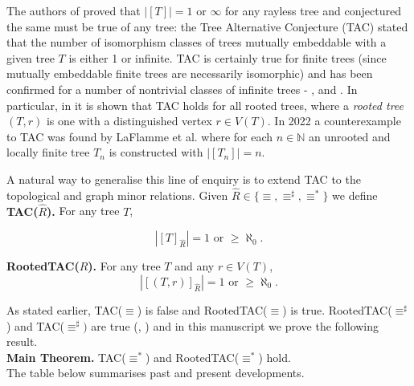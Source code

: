 \documentclass[12pt]{amsart}
\numberwithin{mytheorem}{section} %
\numberwithin{mylemma}{section} %
\numberwithin{mycorollary}{section} %
\newcommand{\N}{\mathbb{N}}
\begin{document}
The authors of \cite{A} proved that $|[T]| = 1$ or $\infty$ for any rayless tree and conjectured the same must be true of any tree: the Tree Alternative Conjecture (TAC) stated that the number of isomorphism classes of trees mutually embeddable with a given tree $T$ is either 1 or infinite. TAC is certainly true for finite trees (since mutually embeddable finite trees are necessarily isomorphic) and has been confirmed for a number of nontrivial classes of infinite trees -  \cite{A}, \cite{LPS} and \cite{T}. In particular, in \cite{T} it is shown that TAC holds for all rooted trees, where a {\it rooted tree} $(T,r)$ is one with a distinguished vertex $r\in V(T)$. In 2022 a counterexample to TAC was found by LaFlamme et al. \cite{ALTW} where for each $n\in \N$ an unrooted and locally finite tree $T_n$ is constructed with $|[T_n]| = n$. 

A natural way to generalise this line of enquiry is to extend TAC to the topological and graph minor relations. Given $\hat{R} \in \{\equiv, \equiv^\sharp, \equiv^*\}$ we define\\ 

\noindent
  {\bf TAC($\hat{R}$).} For any tree $T$,
  
   \[
   |[T]_{\hat{R}}| =1 \text{ or } \geq \aleph_0.
   \]  
   
   \bigskip
  \noindent
    {\bf RootedTAC($\hat{R}$).} For any tree $T$ and any $r\in V(T)$,
   \[
   |[(T,r)]_{\hat{R}}| = 1 \text{ or } \geq \aleph_0.
   \]  
   
   \bigskip
  \noindent
As stated earlier, TAC($\equiv$) is false and RootedTAC($\equiv$) is true. RootedTAC($\equiv^\sharp$) and TAC($\equiv^\sharp)$ are true (\cite{BP1}, \cite{BP2}) and in this manuscript we prove the following result.\\

  \noindent
  {\bf Main Theorem.} 
 TAC($ \equiv^*$) and RootedTAC($ \equiv^*$) hold. \\
 
 \noindent
 The table below summarises past and present developments.
\end{document}
